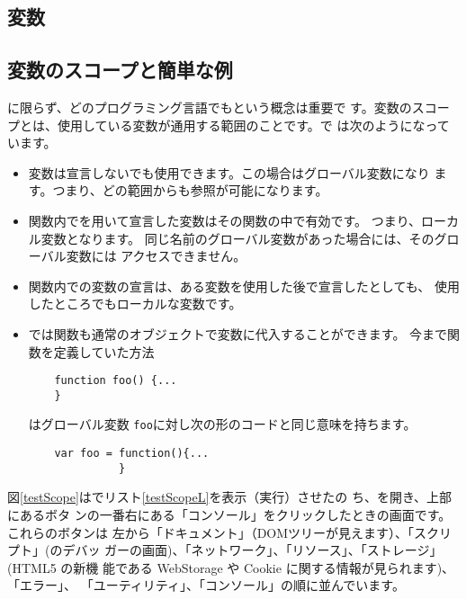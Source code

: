 \subsection{変数}
\subsection{変数のスコープと簡単な例}
\JS に限らず、どのプログラミング言語でもという概念は重要で
す。変数のスコープとは、使用している変数が通用する範囲のことです。\JS で
は次のようになっています。
\begin{itemize}
 \item 変数は宣言しないでも使用できます。この場合はグローバル変数になり
       ます。つまり、どの範囲からも参照が可能になります。
 \item 関数内でを用いて宣言した変数はその関数の中で有効です。
       つまり、ローカル変数となります。
       同じ名前のグローバル変数があった場合には、そのグローバル変数には
       アクセスできません。
 \item 関数内での変数の宣言は、ある変数を使用した後で宣言したとしても、
       使用したところでもローカルな変数です。
 \item \JS では関数も通常のオブジェクトで変数に代入することができます。
       今まで関数を定義していた方法
\begin{verbatim}
	function foo() {...
	}
\end{verbatim}
はグローバル変数 \texttt{foo}に対し次の形のコードと同じ意味を持ちます。
\begin{verbatim}
	var foo = function(){...
	          }
\end{verbatim}
\end{itemize}
図\ref{testScope}は\Opera でリスト\ref{testScopeL}を表示（実行）させたの
ち、を開き、上部にあるボタ
ンの一番右にある「コンソール」をクリックしたときの画面です。これらのボタンは
左から「ドキュメント」（DOMツリーが見えます）、「スクリプト」(\JS のデバッ
ガーの画面)、「ネットワーク」、「リソース」、「ストレージ」(HTML5 の新機
能である WebStorage や Cookie に関する情報が見られます)、「エラー」、
「ユーティリティ」、「コンソール」の順に並んでいます。

